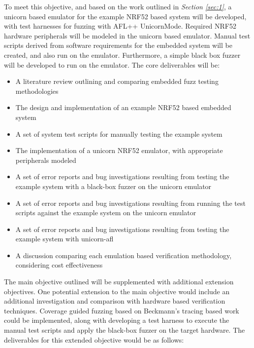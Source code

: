 \documentclass[11pt]{article}
\begin{document}
To meet this objective, and based on the work outlined in \textit{Section
\ref{sec:1}}, a unicorn based emulator for the example NRF52 based system will
be developed, with test harnesses for fuzzing with AFL++ UnicornMode. Required
NRF52 hardware peripherals will be modeled in the unicorn based emulator.
Manual test scripts derived from software requirements for the embedded system
will be created, and also run on the emulator. Furthermore, a simple black box
fuzzer will be developed to run on the emulator. The core deliverables will be:

\begin{itemize}
\item A literature review outlining and comparing embedded fuzz testing methodologies
\item The design and implementation of an example NRF52 based embedded system
\item A set of system test scripts for manually testing the example system
\item The implementation of a unicorn NRF52 emulator, with appropriate peripherals modeled
\item A set of error reports and bug investigations resulting from testing the example system with a black-box fuzzer on the unicorn emulator
\item A set of error reports and bug investigations resulting from running the test scripts against the example system on the unicorn emulator
\item A set of error reports and bug investigations resulting from testing the example system with unicorn-afl
\item A discussion comparing each emulation based verification methodology, considering cost effectiveness
\end{itemize}

The main objective outlined will be supplemented with additional extension
objectives. One potential extension to the main objective would include an
additional investigation and comparison with hardware based verification
techniques. Coverage guided fuzzing based on Beckmann's tracing based work
\citep{Beckmann_2023} could be implemented, along with developing a test
harness to execute the manual test scripts and apply the black-box fuzzer on
the target hardware. The deliverables for this extended objective would be as follows:
\end{document}
